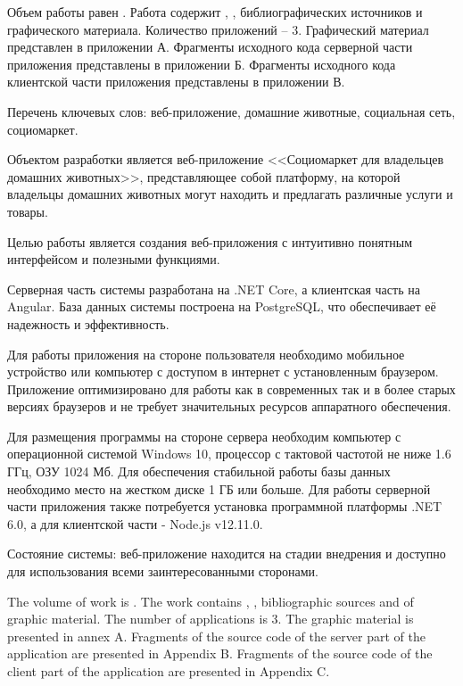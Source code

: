 
Объем работы равен . Работа содержит , ,  библиографических источников и  графического материала. Количество приложений – 3. Графический материал представлен в приложении А. Фрагменты исходного кода серверной части приложения представлены в приложении Б. Фрагменты исходного кода клиентской части приложения представлены в приложении В.

Перечень ключевых слов: веб-приложение, домашние животные, социальная сеть, социомаркет.

Объектом разработки является веб-приложение <<Социомаркет для владельцев домашних животных>>, представляющее собой платформу, на которой владельцы домашних животных могут находить и предлагать различные услуги и товары.

Целью работы является создания веб-приложения с интуитивно понятным интерфейсом и полезными функциями.

Серверная часть системы разработана на .NET Core, а клиентская часть на Angular. База данных системы построена на PostgreSQL, что обеспечивает её надежность и эффективность.

Для работы приложения на стороне пользователя необходимо мобильное устройство или компьютер с доступом в интернет с установленным браузером. Приложение оптимизировано для работы как в современных так и в более старых версиях браузеров и не требует значительных ресурсов аппаратного обеспечения.

Для размещения программы на стороне сервера необходим компьютер с операционной системой Windows 10, процессор с тактовой частотой не ниже 1.6 ГГц, ОЗУ 1024 Мб. Для обеспечения стабильной работы базы данных необходимо место на жестком диске 1 ГБ или больше. Для работы серверной части приложения также потребуется установка программной платформы .NET 6.0, а для клиентской части -\- Node.js v12.11.0.

Состояние системы: веб-приложение находится на стадии внедрения и доступно для использования всеми заинтересованными сторонами.

  
The volume of work is . The work contains , ,  bibliographic sources and  of graphic material. The number of applications is 3. The graphic material is presented in annex A. Fragments of the source code of the server part of the application are presented in Appendix B. Fragments of the source code of the client part of the application are presented in Appendix C.

